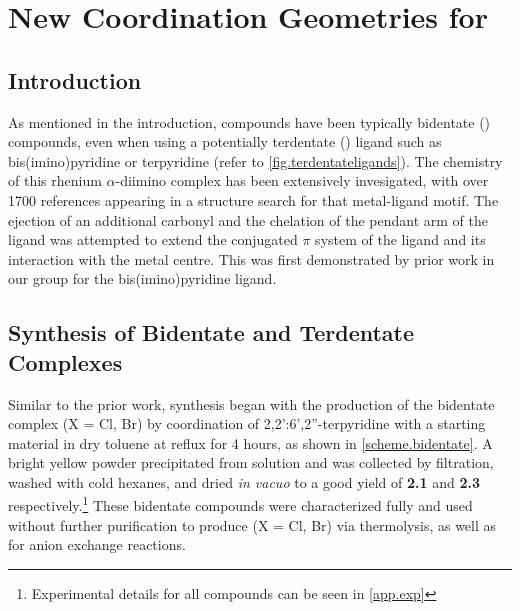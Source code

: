 \chapter{New Coordination Geometries for \texorpdfstring{}{Rhenium (I)}}\label{chap.newchem}
\section{Introduction}

As mentioned in the introduction,  compounds have been typically bidentate () compounds, even when using a potentially terdentate () ligand such as bis(imino)pyridine or terpyridine (refer to \autoref{fig.terdentateligands}). The chemistry of this rhenium $\alpha$-diimino complex has been extensively invesigated, with over 1700 references appearing in a structure search for that metal-ligand motif. The ejection of an additional carbonyl and the chelation of the pendant arm of the ligand was attempted to extend the conjugated $\pi$ system of the ligand and its interaction with the metal centre. This was first demonstrated by prior work in our group for the bis(imino)pyridine ligand\autocite{jurca2013}. 

\section{Synthesis of Bidentate and Terdentate \texorpdfstring{}{Rhenium (I)} Complexes}

Similar to the prior work, synthesis began with the production of the bidentate complex  (X = Cl, Br) by coordination of 2,2':6',2''-terpyridine with a  starting material in dry toluene at reflux for 4 hours, as shown in \autoref{scheme.bidentate}. A bright yellow powder precipitated from solution and was collected by filtration, washed with cold hexanes, and dried \textit{in vacuo} to a good yield of \textbf{2.1} and \textbf{2.3} respectively.\footnote{Experimental details for all compounds can be seen in \autoref{app.exp} } These bidentate compounds were characterized fully and used without further purification to produce  (X = Cl, Br) via thermolysis, as well as for anion exchange reactions. 

